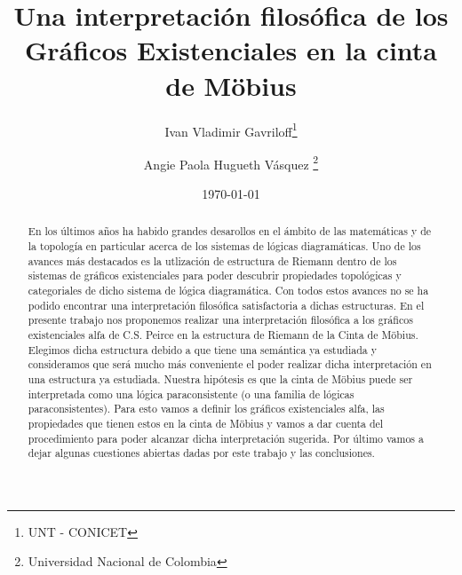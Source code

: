 \documentclass[
	fontsize=10pt, %
	twoside=true, %
	secnumdepth=1, %
	abstract=true, %
]{kaohandt}
\begin{document}

\title[Una interpretación filosófica de los Gráficos Existenciales en la cinta de Möbius]{Una interpretación filosófica de los Gráficos Existenciales en la cinta de Möbius}

\author[IVG, APHV]{Ivan Vladimir Gavriloff\thanks{UNT - CONICET} \and Angie Paola Hugueth Vásquez \thanks{Universidad Nacional de Colombia}}

\date{\today}


\maketitle

\margintoc

\begin{abstract}
	\noindent
	En los últimos años ha habido grandes desarollos en el ámbito de las matemáticas y de la topología en particular acerca de los sistemas de lógicas diagramáticas. Uno de los avances más destacados es la utlización de estructura de Riemann dentro de los sistemas de gráficos existenciales para poder descubrir propiedades topológicas y categoriales de dicho sistema de lógica diagramática. Con todos estos avances no se ha podido encontrar una interpretación filosófica satisfactoria a dichas estructuras.
	En el presente trabajo nos proponemos realizar una interpretación filosófica a los gráficos existenciales alfa de C.S. Peirce en la estructura de Riemann de la Cinta de Möbius. Elegimos dicha estructura debido a que tiene una semántica ya estudiada y consideramos que será mucho más conveniente el poder realizar dicha interpretación en una estructura ya estudiada. Nuestra hipótesis es que la cinta de Möbius puede ser interpretada como una lógica paraconsistente (o una familia de lógicas paraconsistentes). Para esto vamos a definir los gráficos existenciales alfa, las propiedades que tienen estos en la cinta de Möbius y vamos a dar cuenta del procedimiento para poder alcanzar dicha interpretación sugerida. Por último vamos a dejar algunas cuestiones abiertas dadas por este trabajo y las conclusiones.
\end{abstract}
\end{document}
